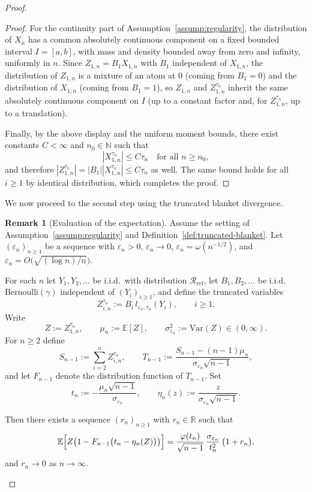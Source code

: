 \documentclass{article}
\theoremstyle{plain}
\theoremstyle{definition}
\newtheorem{lemma}[theorem]{Remark}
\begin{document}
\begin{proof}
\begin{proof}
For the continuity part of Assumption~\ref{assump:regularity}, the distribution of
$X_n$ has a common absolutely continuous component on a fixed bounded
interval $I=[a,b]$, with mass and density bounded away from zero and infinity,
uniformly in $n$.
Since $Z_{1,n} = B_1 X_{1,n}$ with $B_1$ independent of $X_{1,n}$,
the distribution of $Z_{1,n}$ is a mixture of an atom at $0$ (coming from $B_1=0$)
and the distribution of $X_{1,n}$ (coming from $B_1=1$), so $Z_{1,n}$ and
$Z_{1,n}^{\tau_n}$ inherit the same absolutely continuous component on $I$
(up to a constant factor and, for $Z_{1,n}^{\tau_n}$, up to a translation).

Finally, by the above display and the uniform moment bounds, there exist
constants $C<\infty$ and $n_0\in\mathbb N$ such that
\[
  |X_{1,n}^{\tau_n}|\le C \tau_n \quad\text{for all }n\ge n_0,
\]
and therefore $|Z_{1,n}^{\tau_n}| = |B_1||X_{1,n}^{\tau_n}|\le C \tau_n$ as well.
The same bound holds for all $i\ge1$ by identical distribution, which
completes the proof.
\end{proof}

We now proceed to the second step using the truncated blanket divergence.

\begin{lemma}[Evaluation of the expectation]
\label{lem:inner-expectation}
Assume the setting of Assumption~\ref{assump:regularity} and
Definition~\ref{def:truncated-blanket}.  Let $(\varepsilon_n)_{n\ge1}$
be a sequence with $\varepsilon_n>0$, $\varepsilon_n\to0$,
$\varepsilon_n=\omega(n^{-1/2})$, and
$\varepsilon_n = O\!\bigl(\sqrt{(\log n)/n}\bigr)$.

For each $n$ let $Y_1,Y_2,\dots$ be i.i.d.\ with distribution
$\mathcal R_{\mathrm{ref}}$, let $B_1,B_2,\dots$ be i.i.d.\
$\mathrm{Bernoulli}(\gamma)$ independent of $(Y_i)_{i\ge1}$, and define
the truncated variables
\[
  Z_{i,n}^{\tau_n} := B_i\,l_{\varepsilon_n,\tau_n}(Y_i),\qquad i\ge1.
\]
Write
\[
  Z := Z_{1,n}^{\tau_n},\qquad
  \mu_{n} := \mathbb E[Z],\qquad
  \sigma_{\varepsilon_n}^2 := \mathrm{Var}(Z)\in(0,\infty).
\]
For $n\ge2$ define
\[
  S_{n-1} := \sum_{i=2}^n Z_{i,n}^{\tau_n},\qquad
  T_{n-1} := \frac{S_{n-1} - (n-1)\mu_n}{\sigma_{\varepsilon_n}\sqrt{n-1}},
\]
and let $F_{n-1}$ denote the distribution function of $T_{n-1}$.
Set
\[
  t_n := -\frac{\mu_n\sqrt{n-1}}{\sigma_{\varepsilon_n}},
  \qquad
  \eta_n(z) := \frac{z}{\sigma_{\varepsilon_n}\sqrt{n-1}}.
\]

Then there exists a sequence $(r_n)_{n\ge1}$ with $r_n\in\mathbb R$
such that
\begin{equation}
  \label{eq:inner-expectation-asymptotic}
  \mathbb E\Bigl[
    Z\bigl(1-F_{n-1}\bigl(t_n-\eta_n(Z)\bigr)\bigr)
  \Bigr]
  =
  \frac{\varphi(t_n)}{\sqrt{n-1}}\,
  \frac{\sigma_{\varepsilon_n}}{t_n^2}\,
  \bigl(1 + r_n\bigr),
\end{equation}
and $r_n\to0$ as $n\to\infty$.


\end{lemma}
\end{proof}
\end{document}
